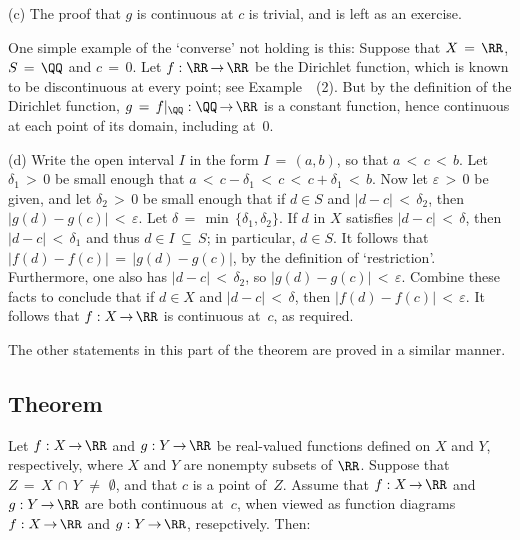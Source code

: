 \V

        (c) The proof that $g$ is continuous at $c$ is trivial, and is left as an exercise.

        One simple example of the `converse' not holding is this: Suppose that $X \,=\, {\RR}$, $S \,=\, {\QQ}$ and $c \,=\, 0$.
    Let $f:{\RR} \,{\rightarrow}\, {\RR}$ be the Dirichlet function, which is known to be discontinuous at every point; see Example~~(2).
    But by the definition of the Dirichlet function, $g \,=\, f|_{{\QQ}}:{\QQ} \,{\rightarrow}\, {\RR}$
    is a constant function, hence continuous at each point of its domain, including at~$0$.

\V

        (d) Write the open interval $I$ in the form $I \,=\, (a,b)$, so that $a\,<\,c\,<\,b$.
    Let ${\delta}_{1}\,>\,0$ be small enough that $a\,<\,c-{\delta}_{1}\,<\,c\,<\,c+{\delta}_{1}\,<\,b$.
    Now let ${\varepsilon}\,>\,0$ be given, and let ${\delta}_{2}\,>\,0$ be small enough that if $d{\in}S$ and $|d-c|\,<\,{\delta}_{2}$,
    then $|g(d)-g(c)|\,<\,{\varepsilon}$. Let ${\delta} \,=\, \min\,\{{\delta}_{1}, {\delta}_{2}\}$.
    If $d$ in $X$ satisfies $|d-c|\,<\,{\delta}$, then $|d-c|\,<\,{\delta}_{1}$ and thus $d{\in}I \,{\subseteq}\, S$; in particular, $d{\in}S$.
    It follows that $|f(d)-f(c)| \,=\, |g(d)-g(c)|$, by the definition of `restriction'.
    Furthermore, one also has $|d-c|\,<\,{\delta}_{2}$, so $|g(d)-g(c)|\,<\,{\varepsilon}$.
    Combine these facts to conclude that if $d{\in}X$ and $|d-c|\,<\,{\delta}$, then $|f(d)-f(c)|\,<\,{\varepsilon}$.
    It follows that $f:X \,{\rightarrow}\, {\RR}$ is continuous at~$c$, as required.

        The other statements in this part of the theorem are proved in a similar manner.


\VV

            \subsection{\small{\bf Theorem}}
            \label{ThmD20.60B}

\V

        Let $f:X \,{\rightarrow}\, {\RR}$ and $g:Y \,{\rightarrow}\, {\RR}$ be real-valued functions defined on $X$ and $Y$, respectively,
    where $X$ and $Y$ are nonempty subsets of ${\RR}$. Suppose that $Z \,=\, X\,{\cap}\,Y \,\,{\neq}\,\, {\emptyset}$,
    and that $c$ is a point of~$Z$. Assume that $f:X \,{\rightarrow}\, {\RR}$ and $g:Y \,{\rightarrow}\, {\RR}$ are both continuous at~$c$,
    when viewed as function diagrams $f:X \,{\rightarrow}\, {\RR}$ and $g:Y \,{\rightarrow}\, {\RR}$, resepctively. Then:

